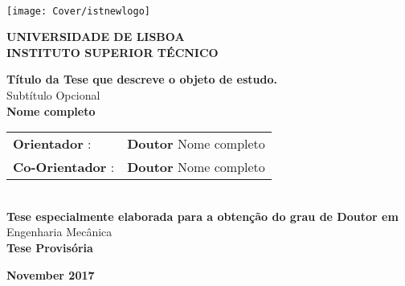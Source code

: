 \setcounter{page}{1} 


\thispagestyle{empty}
\begin{flushleft} ~\\ \vspace{-12mm} \hspace{-12mm}  \texttt{[image: Cover/istnewlogo]} 
 
\centering
\LARGE \textbf{UNIVERSIDADE DE LISBOA \\ INSTITUTO SUPERIOR TÉCNICO}
\vspace{30mm}

 \vspace{5mm}
 
\centering
\LARGE \textbf{Título da Tese que descreve o objeto de estudo.}
\\ \vspace{10mm}
\Large Subtítulo Opcional
\\ \vspace{15mm}
\Large \textbf{Nome completo} \\
\vspace{4cm}

\begin{minipage}{\textwidth}
\begin{tabularx}{\textwidth}{ l @{ } l }
\large \textbf{Orientador} : & \textbf{Doutor} Nome completo\\
 \large \textbf{Co-Orientador} :  & \textbf{Doutor} Nome completo\\
\end{tabularx}

\end{minipage}
%
\\ \vspace{27mm}
\centering
\large \textbf{Tese especialmente elaborada para a obtenção do grau de Doutor em}\\
\large Engenharia Mecânica\\
\vspace{18mm}
\Large \textbf{Tese Provisória}
 
\vspace{15mm}

\large \textbf{November 2017} \\
\let\thepage\relax
\end{flushleft}
\pagebreak
